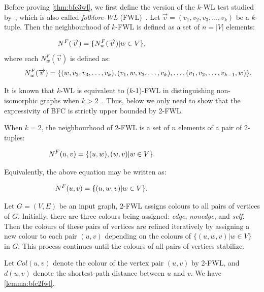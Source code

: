 Before proving \cref{thm:bfc3wl}, we first define the version of the $k$-WL test studied by~\citet{cai1992optimal}, which is also called \emph{folklore-WL} (FWL)~\cite{morris2019weisfeiler}. Let $\overrightarrow{v}=(v_1, v_2,v_3,\dots, v_k)$ be a $k$-tuple. Then the neighbourhood of $k$-FWL is defined as a set of $n=|V|$ elements:

\begin{equation*}
    \hspace*{-3cm}N^F(\overrightarrow{v}) = \{N^F_w(\overrightarrow{v})|w\in V\},
\end{equation*} 
where each $N^F_w(\overrightarrow{v})$ is defined as:
\begin{equation*}
    \hspace{0.6cm}N^F_w(\overrightarrow{v}) = \{(w, v_2,v_3,\dots, v_k), (v_1,w,v_3,\dots, v_k), \dots, (v_1,v_2,\dots, v_{k-1},w) \}.
\end{equation*}

It is known that $k$-WL is equivalent to ($k$-1)-FWL in distinguishing non-isomorphic graphs when $k >2$~\cite{cai1992optimal}. Thus, below we only need to show that the expressivity of BFC is strictly upper bounded by 2-FWL.

When $k=2$, the neighbourhood of $2$-FWL is a set of $n$ elements of a pair of 2-tuples:

\begin{equation}
    \hspace*{-3cm}N^F(u,v) = \{(u,w),(w,v)|w\in V\}.
\end{equation}

Equivalently, the above equation may be written as:

\begin{equation}\label{equ:2-fwl}
    \hspace*{-3cm}N^F(u,v) = \{(u,w,v)|w\in V\}. 
\end{equation}


Let $G=(V,E)$ be an input graph, $2$-FWL assigns colours to all pairs of vertices of $G$. Initially, there are three colours being assigned: \emph{edge}, \emph{nonedge}, and \emph{self}.
Then the colours of these pairs of vertices are refined iteratively by assigning a new colour to each pair $(u, v)$ depending on the colours of $\{(u,w,v)|w\in V\}$ in $G$. This process continues until the colours of all pairs of vertices stabilize.     

Let $Col(u,v)$ denote the colour of the vertex pair $(u,v)$ by 2-FWL, and $d(u,v)$ denote the shortest-path distance between $u$ and $v$. We have \cref{lemma:bfc2fwl}.

